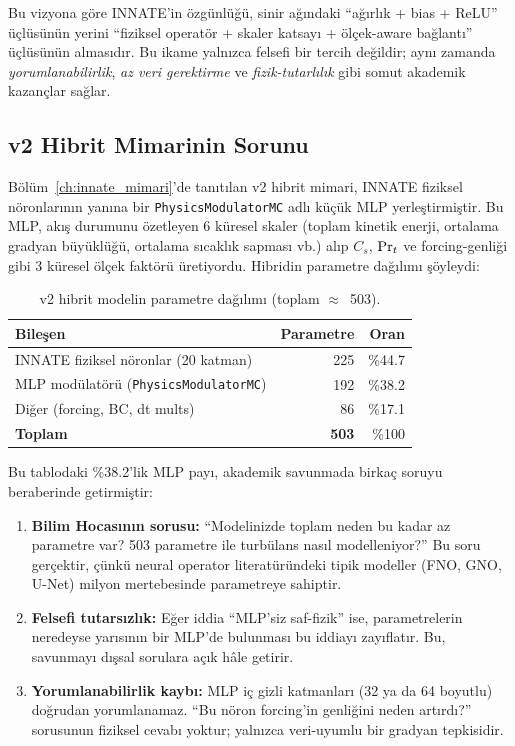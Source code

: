 Bu vizyona göre INNATE'in özgünlüğü, sinir ağındaki ``ağırlık + bias +
ReLU'' üçlüsünün yerini ``fiziksel operatör + skaler katsayı + ölçek-aware
bağlantı'' üçlüsünün almasıdır. Bu ikame yalnızca felsefi bir tercih
değildir; aynı zamanda \emph{yorumlanabilirlik}, \emph{az veri gerektirme}
ve \emph{fizik-tutarlılık} gibi somut akademik kazançlar sağlar.

\subsection{v2 Hibrit Mimarinin Sorunu}

Bölüm~\ref{ch:innate_mimari}'de tanıtılan v2 hibrit mimari, INNATE
fiziksel nöronlarının yanına bir \texttt{PhysicsModulatorMC} adlı küçük
MLP yerleştirmiştir. Bu MLP, akış durumunu özetleyen 6 küresel skaler
(toplam kinetik enerji, ortalama gradyan büyüklüğü, ortalama sıcaklık
sapması vb.) alıp $C_s$, $\mathrm{Pr}_t$ ve forcing-genliği gibi 3 küresel
ölçek faktörü üretiyordu. Hibridin parametre dağılımı şöyleydi:

\begin{table}[H]
\centering
\caption{v2 hibrit modelin parametre dağılımı (toplam $\approx$~503).}
\label{tab:v2-params}
\begin{tabular}{lrr}
\toprule
\textbf{Bileşen} & \textbf{Parametre} & \textbf{Oran} \\
\midrule
INNATE fiziksel nöronlar (20 katman) & 225 & \%44.7 \\
MLP modülatörü (\texttt{PhysicsModulatorMC}) & 192 & \%38.2 \\
Diğer (forcing, BC, dt mults)        &  86 & \%17.1 \\
\midrule
\textbf{Toplam} & \textbf{503} & \%100 \\
\bottomrule
\end{tabular}
\end{table}

Bu tablodaki \%38.2'lik MLP payı, akademik savunmada birkaç soruyu
beraberinde getirmiştir:

\begin{enumerate}
  \item \textbf{Bilim Hocasının sorusu:} ``Modelinizde toplam neden bu
        kadar az parametre var? 503 parametre ile turbülans nasıl
        modelleniyor?'' Bu soru gerçektir, çünkü neural operator
        literatüründeki tipik modeller (FNO, GNO, U-Net) milyon mertebesinde
        parametreye sahiptir.
  \item \textbf{Felsefi tutarsızlık:} Eğer iddia ``MLP'siz saf-fizik'' ise,
        parametrelerin neredeyse yarısının bir MLP'de bulunması bu iddiayı
        zayıflatır. Bu, savunmayı dışsal sorulara açık hâle getirir.
  \item \textbf{Yorumlanabilirlik kaybı:} MLP iç gizli katmanları
        (32 ya da 64 boyutlu) doğrudan yorumlanamaz. ``Bu nöron
        forcing'in genliğini neden artırdı?'' sorusunun fiziksel cevabı
        yoktur; yalnızca veri-uyumlu bir gradyan tepkisidir.
\end{enumerate}

